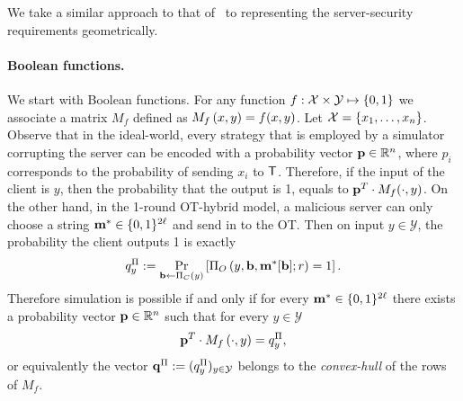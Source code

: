 \documentclass{llncs}
\newcommand{\X}{\mathcal{X}}
\newcommand{\Y}{\mathcal{Y}}
\newcommand{\p}{\myvec{p}}
\renewcommand{\q}{\myvec{q}}
\renewcommand{\b}{\myvec{b}}
\newcommand{\m}{\myvec{m}}
\begin{document}
We take a similar approach to that of~\cite{Ash14} 
to representing the server-security requirements geometrically. 

\paragraph{Boolean functions.}
We start with Boolean functions. For any function $f:\X\times\Y\mapsto\zo$ we associate a matrix $M_f$ defined as $M_f\left ( x,y \right )=f(x,y)$. Let $\X=\set{x_1,\ldots,x_n}$.
Observe that in the ideal-world, every strategy that is employed by a simulator corrupting the server can be encoded with a probability vector $\p\in\R^{n}$, where $p_i$ corresponds to the probability of sending $x_i$ to $\mathsf{T}$. Therefore, if the input of the client is $y$, then the probability that the output is 1, equals to $\p^T\cdot M_f(\cdot,y)$. 
On the other hand, in the 1-round OT-hybrid model, a malicious server can only choose a string ${\bf m}^*\in\{0,1\}^{2\ell}$ and send in to the OT. Then on input $y\in\Y$, the probability the client outputs 1 is exactly
$$q^{\Pi}_y:=\Pr_{\b\from\Pi_C\of{y}}\left[\Pi_O\of{y,\b,\m^*[\b];r}=1\right].$$
Therefore simulation is possible if and only if for every $\m^*\in\zo^{2\ell}$ there exists a probability vector $\p\in\R^n$ such that for every $y\in\Y$
$$\p^T\cdot M_f\of{\cdot,y}=q^{\Pi}_y,$$
or equivalently the vector $\q^{\Pi}:=(q^{\Pi}_y)_{y\in\Y}$ belongs to the \emph{convex-hull} of the rows of $M_f$.
\end{document}
